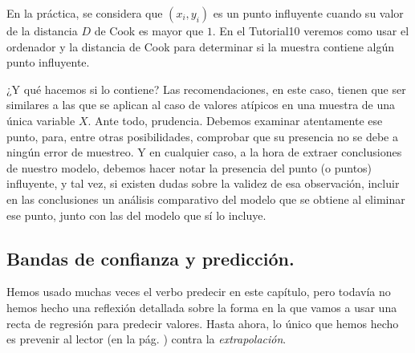 En la práctica, se considera que $(x_i,y_i)$ es un {\sf punto influyente} cuando su valor de la distancia $D$ de Cook es mayor que $1$. En el Tutorial10 veremos como usar el ordenador y la distancia de Cook para determinar si la muestra contiene algún punto influyente.

¿Y qué hacemos si lo contiene? Las recomendaciones, en este caso, tienen que ser similares a las que se aplican al caso de valores atípicos en una muestra de una única variable $X$. Ante todo, prudencia. Debemos examinar atentamente ese punto, para, entre otras posibilidades, comprobar que su presencia no se debe a ningún error de muestreo. Y en cualquier caso, a la hora de extraer conclusiones de nuestro modelo, debemos hacer notar la presencia del punto (o puntos) influyente, y tal vez, si existen dudas sobre la validez de esa observación, incluir en las conclusiones un análisis comparativo del modelo que se obtiene al eliminar ese punto, junto con las del modelo que sí lo incluye.

\subsection{Bandas de confianza y predicción.}
\label{cap10:subsec:BandasConfianzaPrediccion}

Hemos usado muchas veces el verbo predecir en este capítulo, pero todavía no hemos hecho una reflexión detallada sobre la forma en la que vamos a usar una recta de regresión para predecir valores. Hasta ahora, lo único que hemos hecho es prevenir al lector (en la pág. \pageref{cap10:subsubsec:Extrapolacion}) contra la {\em extrapolación}.

